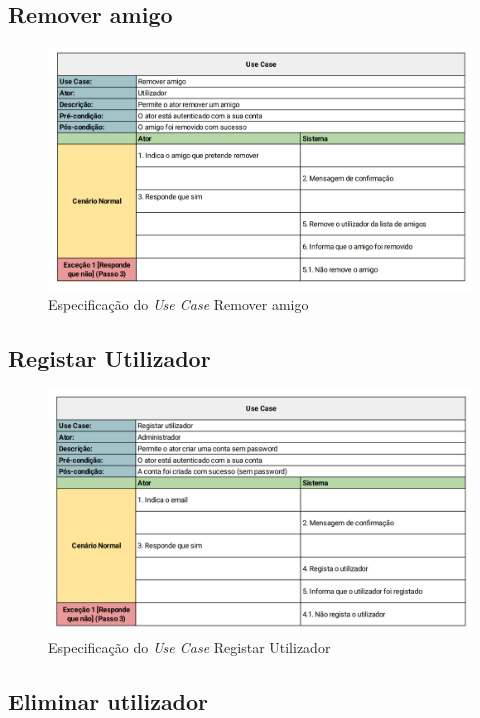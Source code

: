 \documentclass[a4paper]{report}
\begin{document}
\subsection{Remover amigo}

\begin{figure}[H]
	\centering 
    \includegraphics[width=\textwidth]{images/Remover_Amigo.png}  
    \caption{Especificação do \emph{Use Case} Remover amigo}
\end{figure}

\subsection{Registar Utilizador}

\begin{figure}[H]
	\centering 
    \includegraphics[width=\textwidth]{images/Criar_Conta.png}  
    \caption{Especificação do \emph{Use Case} Registar Utilizador}
\end{figure}

\subsection{Eliminar utilizador}
\end{document}
